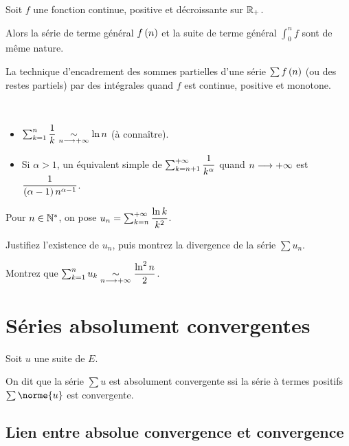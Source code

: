 \begin{prop}
Soit \(f\) une fonction continue, positive et décroissante sur \(\mathbb{R}_+\).

Alors la série de terme général \(f\left(n\right)\) et la suite de terme général \(\int_0^nf\) sont de même nature.
\end{prop}

\begin{meth}[À retenir]
La technique d'encadrement des sommes partielles d'une série \(\sum f\left(n\right)\) (ou des restes partiels) par des intégrales quand \(f\) est continue, positive et monotone.
\end{meth}

\begin{ex}~\\
\begin{itemize}
    \item \(\sum_{k=1}^n\dfrac{1}{k}\underset{n\longrightarrow+\infty}{\sim}\ln n\) (à connaître). \\
    \item Si \(\alpha>1\), un équivalent simple de \(\sum_{k=n+1}^{+\infty}\dfrac{1}{k^\alpha}\) quand \(n\longrightarrow+\infty\) est \(\dfrac{1}{\left(\alpha-1\right)n^{\alpha-1}}\).
\end{itemize}
\end{ex}

\begin{exo}
Pour \(n\in\mathbb{N}^*\), on pose \(u_n=\sum_{k=n}^{+\infty}\dfrac{\ln k}{k^2}\).

Justifiez l'existence de \(u_n\), puis montrez la divergence de la série \(\sum u_n\).

Montrez que \(\sum_{k=1}^nu_k\underset{n\longrightarrow+\infty}{\sim}\dfrac{\ln^2n}{2}\).
\end{exo}

\section{Séries absolument convergentes}

\begin{defi}
Soit \(u\) une suite de \(E\).

On dit que la série \(\sum u\) est absolument convergente ssi la série à termes positifs \(\sum\norme{u}\) est convergente.
\end{defi}

\subsection{Lien entre absolue convergence et convergence}

